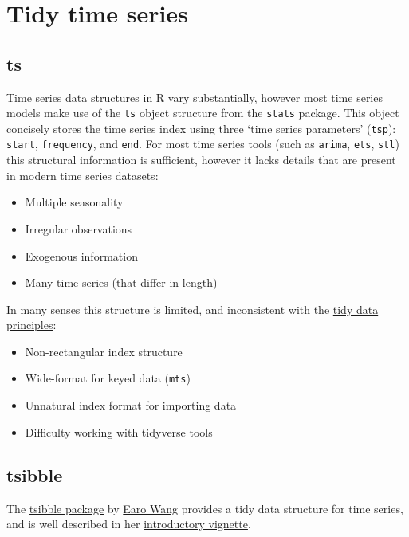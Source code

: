 \documentclass[]{book}
\providecommand{\tightlist}{%
  \setlength{\itemsep}{0pt}\setlength{\parskip}{0pt}}
\begin{document}
\hypertarget{tsibble}{%
\chapter{Tidy time series}\label{tsibble}}

\hypertarget{ts}{%
\section{ts}\label{ts}}

Time series data structures in R vary substantially, however most time series models make use of the \texttt{ts} object structure from the \texttt{stats} package. This object concisely stores the time series index using three `time series parameters' (\texttt{tsp}): \texttt{start}, \texttt{frequency}, and \texttt{end}. For most time series tools (such as \texttt{arima}, \texttt{ets}, \texttt{stl}) this structural information is sufficient, however it lacks details that are present in modern time series datasets:

\begin{itemize}
\tightlist
\item
  Multiple seasonality
\item
  Irregular observations
\item
  Exogenous information
\item
  Many time series (that differ in length)
\end{itemize}

In many senses this structure is limited, and inconsistent with the \href{https://cran.r-project.org/web/packages/tidyr/vignettes/tidy-data.html}{tidy data principles}:

\begin{itemize}
\tightlist
\item
  Non-rectangular index structure
\item
  Wide-format for keyed data (\texttt{mts})
\item
  Unnatural index format for importing data
\item
  Difficulty working with tidyverse tools
\end{itemize}

\hypertarget{tsibble-1}{%
\section{tsibble}\label{tsibble-1}}

The \href{https://github.com/tidyverts/tsibble}{tsibble package} by \href{https://github.com/earowang}{Earo Wang} provides a tidy data structure for time series, and is well described in her \href{https://pkg.earo.me/tsibble/articles/intro-tsibble.html}{introductory vignette}.
\end{document}

